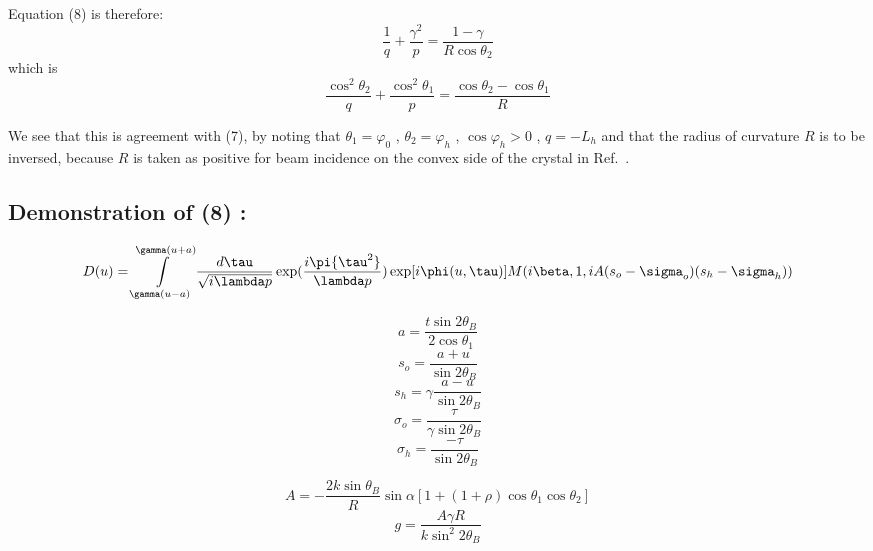 \documentclass{iucr}              %
\begin{document}
Equation (8) is therefore:
\begin{equation}
\frac{1}{q} + \frac{{{\gamma ^2}}}{p} = \frac{{1 - \gamma }}{{R\cos {\theta _2}}}
\end{equation}
which is  
\begin{equation}
\frac{{{{\cos }^2}{\theta _2}}}{q} + \frac{{{{\cos }^2}{\theta _1}}}{p} = \frac{{\cos {\theta _2} - \cos {\theta _1}}}{R}
\end{equation}

We see that this is agreement with  (7), by noting that  $\theta_1=\varphi_0$ , $\theta_2=\varphi_h$ , $\cos\varphi_h>0$ , $q=-L_h$  and that the radius of curvature  $R$  is to be inversed, because $R$ is taken as positive for beam incidence on the convex side of the crystal in Ref.~\cite{GuigayFerrero2016}.

\subsection{Demonstration of (8) :}

\begin{equation}
D(u) = \int\limits_{\gamma (u - a)}^{\gamma (u + a)} {\frac{{d\tau }}{{\sqrt {i\lambda p} }}} \exp (\frac{{i\pi {\tau ^2}}}{{\lambda p}})\exp [i\phi (u,\tau )]M(i\beta ,1,iA({s_o} - {\sigma _o})({s_h} - {\sigma _h}))\\
{\rm{       }}
\end{equation}

\begin{equation}
a = \frac{{t\sin 2{\theta _B}}}{{2\cos {\theta _1}}}
\end{equation}
\begin{equation}
{s_o} = \frac{{a + u}}{{\sin 2{\theta _B}}}
\end{equation}
\begin{equation}
{s_h} = \gamma \frac{{a - u}}{{\sin 2{\theta _B}}}
\end{equation}
\begin{equation}
{\sigma _o} = \frac{\tau }{{\gamma \sin 2{\theta _B}}}
\end{equation}
\begin{equation}
{\sigma _h} = \frac{{ - \tau }}{{\sin 2{\theta _B}}}
\end{equation}

\begin{equation}
A =  - \frac{{2k\sin {\theta _B}}}{R}\sin \alpha [1 + (1 + \rho )\cos {\theta _1}\cos {\theta _2}]
\end{equation}
\begin{equation}
g = \frac{{A\gamma R}}{{k{{\sin }^2}2{\theta _B}}}
\end{equation}
\end{document}
